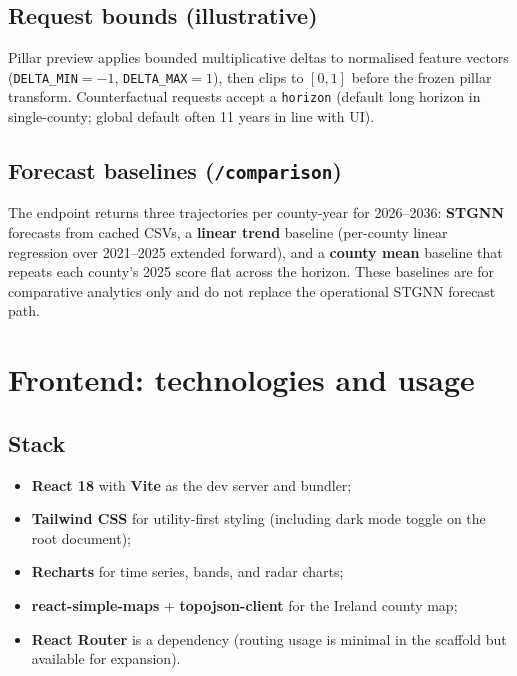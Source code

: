 \documentclass[11pt,a4paper]{article}
\begin{document}
\subsection{Request bounds (illustrative)}
Pillar preview applies bounded multiplicative deltas to normalised feature vectors (\texttt{DELTA\_MIN}${}=-1$, \texttt{DELTA\_MAX}${}=1$), then clips to $[0,1]$ before the frozen pillar transform. Counterfactual requests accept a \texttt{horizon} (default long horizon in single-county; global default often 11 years in line with UI).

\subsection{Forecast baselines (\texttt{/comparison})}
The endpoint  returns three trajectories per county-year for 2026--2036: \textbf{STGNN} forecasts from cached CSVs, a \textbf{linear trend} baseline (per-county linear regression over 2021--2025 extended forward), and a \textbf{county mean} baseline that repeats each county's 2025 score flat across the horizon. These baselines are for comparative analytics only and do not replace the operational STGNN forecast path.

\section{Frontend: technologies and usage}
\subsection{Stack}
\begin{itemize}
  \item \textbf{React 18} with \textbf{Vite} as the dev server and bundler;
  \item \textbf{Tailwind CSS} for utility-first styling (including dark mode toggle on the root document);
  \item \textbf{Recharts} for time series, bands, and radar charts;
  \item \textbf{react-simple-maps} + \textbf{topojson-client} for the Ireland county map;
  \item \textbf{React Router} is a dependency (routing usage is minimal in the scaffold but available for expansion).
\end{itemize}
\end{document}

